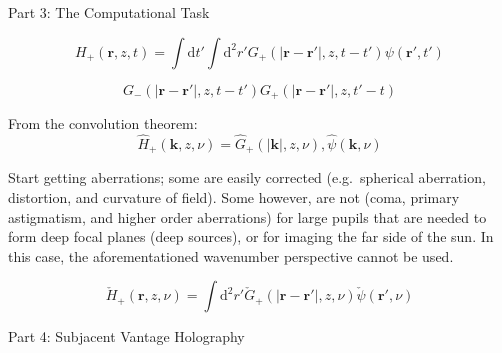 \documentclass{beamer}
\begin{document}
\begin{frame}{Part 3: The Computational Task}
\end{frame}

\begin{frame}{3.1}
\end{frame}

\begin{frame}{3.2}
\end{frame}

\begin{frame}{3.3}
$$ H_{+}(\mathbf{r},z,t) = \int\textrm{d}t' \int\textrm{d}^{2}r'G_{+}
    (|\mathbf{r}-\mathbf{r}'|,z,t-t')\psi(\mathbf{r}',t')  $$
\end{frame}

\begin{frame}{3.4}
$$ G_{-}(|\mathbf{r}-\mathbf{r'}|,z,t-t')
 G_{+}(|\mathbf{r}-\mathbf{r'}|,z,t'-t) $$

\end{frame}

\begin{frame}{3.5}
\end{frame}

\begin{frame}{3.6}
From the convolution theorem:
$$ \hat{H}_{+}(\mathbf{k},z,\nu) = \hat{G}_{+}(|\mathbf{k}|,z,\nu),
     \hat{\psi}(\mathbf{k},\nu) $$
\end{frame}

\begin{frame}{3.7}
Start getting aberrations; some are easily corrected (e.g.\ spherical
aberration, distortion, and curvature of field). Some however, are not
(coma, primary astigmatism, and higher order aberrations) for large
pupils that are needed to form deep focal planes (deep sources), or
for imaging the far side of the sun. In this case, the
aforementationed wavenumber perspective cannot be used.
\end{frame}

\begin{frame}{3.8}
$$ \check{H}_{+}(\mathbf{r},z,\nu) =
    \int\textrm{d}^{2}r'\check{G}_{+}
    (|\mathbf{r}-\mathbf{r}'|,z,\nu)\check{\psi}(\mathbf{r}',\nu) $$
\end{frame}

\begin{frame}{Part 4: Subjacent Vantage Holography}
\end{frame}
\end{document}
